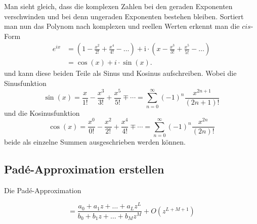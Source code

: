 Man sieht gleich, dass die komplexen Zahlen bei den geraden Exponenten verschwinden und bei denn ungeraden Exponenten bestehen bleiben. 
Sortiert man nun das Polynom nach komplexen und reellen Werten erkennt man die $cis$-Form 
\begin{align*}
e^{ix}
&=
\left(1-\frac{x^{2}}{2 !}+\frac{x^{4}}{4 !}-\ldots\right)+\mathrm{i} \cdot\left(x-\frac{x^{3}}{3 !}+\frac{x^{5}}{5 !}-\ldots\right)
\\
&=
\cos(x)+i\cdot \sin(x).
\end{align*}
und kann diese beiden Teile als Sinus und Kosinus aufschreiben.
Wobei die Sinusfunktion 
\begin{equation*}
\sin (x)
=
\frac{x}{1 !}-\frac{x^{3}}{3 !}+\frac{x^{5}}{5 !} \mp \cdots
=
\sum_{n=0}^{\infty}(-1)^{n} \frac{x^{2 n+1}}{(2 n+1) !}
\end{equation*}
und die Kosinusfunktion 
\begin{equation*}
\cos (x)
=
\frac{x^{0}}{0 !}-\frac{x^{2}}{2 !}+\frac{x^{4}}{4 !} \mp \cdots
=
\sum_{n=0}^{\infty}(-1)^{n} \frac{x^{2 n}}{(2 n) !}
\end{equation*}
beide als einzelne Summen ausgeschrieben werden können.



\subsection{Padé-Approximation erstellen
	\label{pade:subsection:Pade_erstellen}}

Die Padé-Approximation 



\begin{equation}
[L/M]
=
\frac{a_0 + a_1 z + \dots + a_L z^L}{b_0 + b_1 z + \dots + b_M z^M}
+O(z^{L+M+1})
\end{equation}






